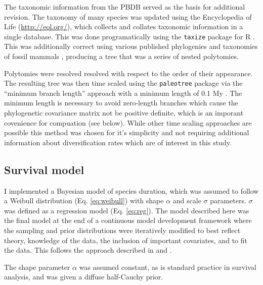 \documentclass[12pt,letterpaper]{article}
\begin{document}
The taxonomic information from the PBDB served as the basis for additional revision. The taxonomy of many species was updated using the Encyclopedia of Life (\url{http://eol.org/}), which collects and collates taxonomic information in a single database. This was done programatically using the \texttt{taxize} package for R \citep{2013taxize}. This was additionally correct using various published phylogenies and taxonomies of fossil mammals \citep{Raia2012f,Janis1998,Janis2008}, producing a tree that was a series of nested polytomies. 

Polytomies were resolved resolved with respect to the order of their appearance. The resulting tree was then time scaled using the \texttt{paleotree} package via the ``minimum branch length'' approach with a minimum length of 0.1 My \citep{Bapst2012a}. The minimum length is necessary to avoid zero-length branches which cause the phylogenetic covariance matrix not be positive definite, which is an imporant covenience for compuation (see below). While other time scaling approaches are possible \citep{Bapst2013a,Hedman2010} this method was chosen for it's simplicity and not requiring additional information about diversification rates which are of interest in this study. 



\subsection{Survival model}

I implemented a Bayesian model of species duration, which was assumed to follow a Weibull distribution (Eq. \ref{eq:weibull}) with shape \(\alpha\) and scale \(\sigma\) parameters. \(\sigma\) was defined as a regression model (Eq. \ref{eq:reg}). The model described here was the final model at the end of a continuous model development framework where the sampling and prior distributions were iteratively modified to best reflect theory, knowledge of the data, the inclusion of important covariates, and to fit the data. This follows the approach described in \citet{Gelman2007} and \citet{Gelman2013d}.

The shape parameter \(\alpha\) was assumed constant, as is standard practice in survival analysis, and was given a diffuse half-Cauchy prior. 
\end{document}
